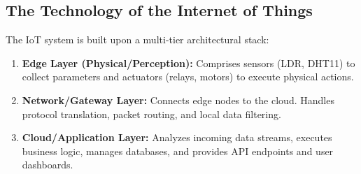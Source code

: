 \documentclass[12pt,a4paper]{article}
\begin{document}
\subsection{The Technology of the Internet of Things}
The IoT system is built upon a multi-tier architectural stack:
\begin{enumerate}[leftmargin=*, itemsep=3pt]
  \item \textbf{Edge Layer (Physical/Perception):} Comprises sensors (LDR, DHT11) to collect parameters and actuators (relays, motors) to execute physical actions.
  \item \textbf{Network/Gateway Layer:} Connects edge nodes to the cloud. Handles protocol translation, packet routing, and local data filtering.
  \item \textbf{Cloud/Application Layer:} Analyzes incoming data streams, executes business logic, manages databases, and provides API endpoints and user dashboards.
\end{enumerate}
\end{document}
